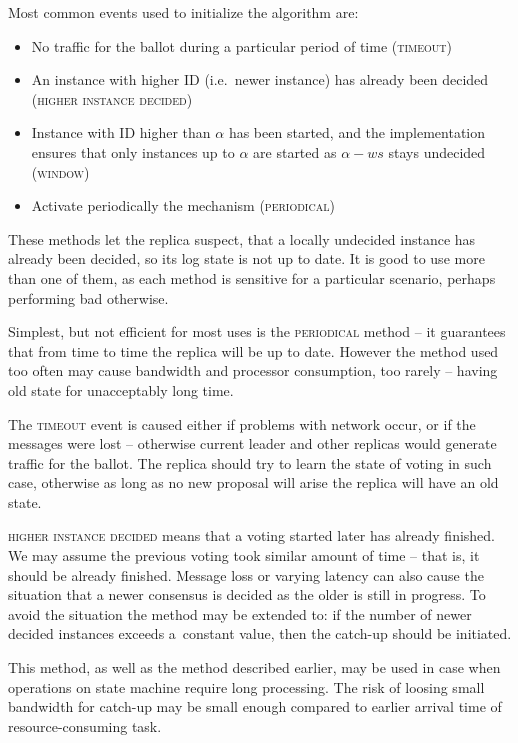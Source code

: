 Most common events used to initialize the algorithm are:
\begin{itemize}
  \item No traffic for the ballot during a particular period of time (\textsc{timeout})
  \item An instance with higher ID (i.e.\ newer instance) has already been decided \\ (\textsc{higher instance decided})
  \item Instance with ID higher than $\alpha$ has been started, and the implementation ensures that only instances up to $\alpha$ are started as $\alpha-ws$ stays undecided (\textsc{window})
  \item Activate periodically the mechanism (\textsc{periodical})
\end{itemize}

These methods let the replica suspect, that a locally undecided instance has already been decided, so its log state is not up to date. It is good to use more than one of them, as each method is sensitive for a particular scenario, perhaps performing bad otherwise.

Simplest, but not efficient for most uses is the \textsc{periodical} method -- it guarantees that from time to time the replica will be up to date.
However the method used too often may cause bandwidth and processor consumption, too rarely -- having old state for unacceptably long time.

The \textsc{timeout} event is caused either if problems with network occur, or if the \accept messages were lost -- otherwise current leader and other replicas would generate traffic for the ballot. The replica should try to learn the state of voting in such case, otherwise as long as no new proposal will arise the replica will have an old state.

\textsc{higher instance decided} means that a voting started later has already finished. We may assume the previous voting took similar amount of time -- that is, it should be already finished. Message loss or varying latency can also cause the situation that a newer consensus is decided as the older is still in progress. To avoid the situation the method may be extended to: if the number of newer decided instances exceeds a~constant value, then the catch-up should be initiated.

This method, as well as the method described earlier, may be used in case when operations on state machine require long processing. The risk of loosing small bandwidth for catch-up may be small enough compared to earlier arrival time of resource-consuming task.

